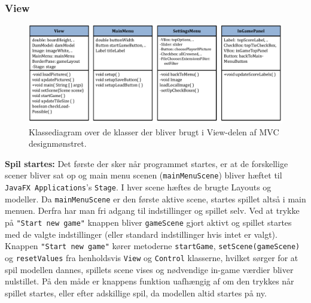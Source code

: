 \subsubsection{View}

\begin{figure}[H]
\centering
\includegraphics[width = 1.0  \textwidth]{Figurer/classesView.pdf}
\caption{Klassediagram over de klasser der bliver brugt i View-delen af MVC designmønstret.}
\label{fig:classesView}
\end{figure}

\textbf{Spil startes:} 
Det første der sker når programmet startes, er at de forskellige scener bliver sat op og main menu scenen (\texttt{mainMenuScene}) bliver hæftet til \texttt{JavaFX Applications}'s \texttt{Stage}. I hver scene hæftes de brugte Layouts og modeller. Da \texttt{mainMenuScene} er den første aktive scene, startes spillet altså i main menuen. Derfra har man fri adgang til indstillinger og spillet selv. Ved at trykke på \texttt{"Start new game"} knappen bliver \texttt{gameScene} gjort aktivt og spillet startes med de valgte indstillinger (eller standard indstillinger hvis intet er valgt). \\

Knappen \texttt{"Start new game"} kører metoderne \texttt{startGame}, \texttt{setScene(gameScene)} og \texttt{resetValues} fra henholdsvis \texttt{View} og \texttt{Control} klasserne, hvilket sørger for at spil modellen dannes, spillets scene vises og nødvendige in-game værdier bliver nulstillet. På den måde er knappens funktion uafhængig af om den trykkes når spillet startes, eller efter adskillige spil, da modellen altid startes på ny. 

